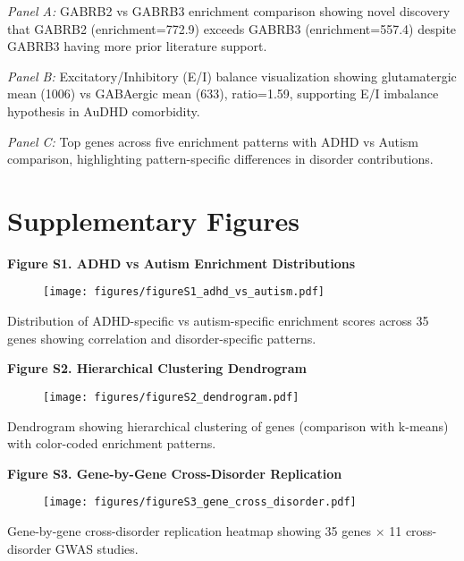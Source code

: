 \documentclass[12pt,letterpaper]{article}
\theoremstyle{definition}
\theoremstyle{remark}
\begin{document}
\textit{Panel A:} GABRB2 vs GABRB3 enrichment comparison showing novel discovery that GABRB2 (enrichment=772.9) exceeds GABRB3 (enrichment=557.4) despite GABRB3 having more prior literature support.

\textit{Panel B:} Excitatory/Inhibitory (E/I) balance visualization showing glutamatergic mean (1006) vs GABAergic mean (633), ratio=1.59, supporting E/I imbalance hypothesis in AuDHD comorbidity.

\textit{Panel C:} Top genes across five enrichment patterns with ADHD vs Autism comparison, highlighting pattern-specific differences in disorder contributions.

\newpage

\section*{Supplementary Figures}

\textbf{Figure S1. ADHD vs Autism Enrichment Distributions}

\begin{figure}[H]
\centering
\texttt{[image: figures/figureS1\_adhd\_vs\_autism.pdf]}
\end{figure}

Distribution of ADHD-specific vs autism-specific enrichment scores across 35 genes showing correlation and disorder-specific patterns.

\vspace{1em}

\textbf{Figure S2. Hierarchical Clustering Dendrogram}

\begin{figure}[H]
\centering
\texttt{[image: figures/figureS2\_dendrogram.pdf]}
\end{figure}

Dendrogram showing hierarchical clustering of genes (comparison with k-means) with color-coded enrichment patterns.

\vspace{1em}

\textbf{Figure S3. Gene-by-Gene Cross-Disorder Replication}

\begin{figure}[H]
\centering
\texttt{[image: figures/figureS3\_gene\_cross\_disorder.pdf]}
\end{figure}

Gene-by-gene cross-disorder replication heatmap showing 35 genes $\times$ 11 cross-disorder GWAS studies.
\end{document}
